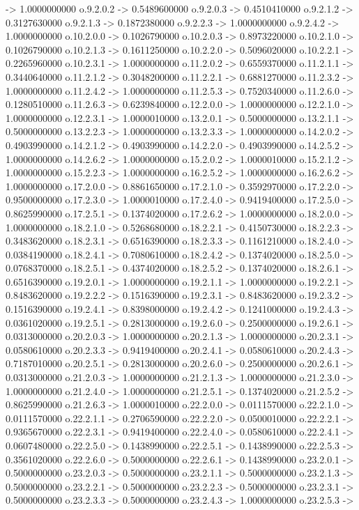 -> 1.0000000000    o.9.2.0.2 -> 0.5489600000    o.9.2.0.3 -> 0.4510410000    o.9.2.1.2 -> 0.3127630000    o.9.2.1.3 -> 0.1872380000    o.9.2.2.3 -> 1.0000000000    o.9.2.4.2 -> 1.0000000000    o.10.2.0.0 -> 0.1026790000    o.10.2.0.3 -> 0.8973220000    o.10.2.1.0 -> 0.1026790000    o.10.2.1.3 -> 0.1611250000    o.10.2.2.0 -> 0.5096020000    o.10.2.2.1 -> 0.2265960000    o.10.2.3.1 -> 1.0000000000    o.11.2.0.2 -> 0.6559370000    o.11.2.1.1 -> 0.3440640000    o.11.2.1.2 -> 0.3048200000    o.11.2.2.1 -> 0.6881270000    o.11.2.3.2 -> 1.0000000000    o.11.2.4.2 -> 1.0000000000    o.11.2.5.3 -> 0.7520340000    o.11.2.6.0 -> 0.1280510000    o.11.2.6.3 -> 0.6239840000    o.12.2.0.0 -> 1.0000000000    o.12.2.1.0 -> 1.0000000000    o.12.2.3.1 -> 1.0000010000    o.13.2.0.1 -> 0.5000000000    o.13.2.1.1 -> 0.5000000000    o.13.2.2.3 -> 1.0000000000    o.13.2.3.3 -> 1.0000000000    o.14.2.0.2 -> 0.4903990000    o.14.2.1.2 -> 0.4903990000    o.14.2.2.0 -> 0.4903990000    o.14.2.5.2 -> 1.0000000000    o.14.2.6.2 -> 1.0000000000    o.15.2.0.2 -> 1.0000010000    o.15.2.1.2 -> 1.0000000000    o.15.2.2.3 -> 1.0000000000    o.16.2.5.2 -> 1.0000000000    o.16.2.6.2 -> 1.0000000000    o.17.2.0.0 -> 0.8861650000    o.17.2.1.0 -> 0.3592970000    o.17.2.2.0 -> 0.9500000000    o.17.2.3.0 -> 1.0000010000    o.17.2.4.0 -> 0.9419400000    o.17.2.5.0 -> 0.8625990000    o.17.2.5.1 -> 0.1374020000    o.17.2.6.2 -> 1.0000000000    o.18.2.0.0 -> 1.0000000000    o.18.2.1.0 -> 0.5268680000    o.18.2.2.1 -> 0.4150730000    o.18.2.2.3 -> 0.3483620000    o.18.2.3.1 -> 0.6516390000    o.18.2.3.3 -> 0.1161210000    o.18.2.4.0 -> 0.0384190000    o.18.2.4.1 -> 0.7080610000    o.18.2.4.2 -> 0.1374020000    o.18.2.5.0 -> 0.0768370000    o.18.2.5.1 -> 0.4374020000    o.18.2.5.2 -> 0.1374020000    o.18.2.6.1 -> 0.6516390000    o.19.2.0.1 -> 1.0000000000    o.19.2.1.1 -> 1.0000000000    o.19.2.2.1 -> 0.8483620000    o.19.2.2.2 -> 0.1516390000    o.19.2.3.1 -> 0.8483620000    o.19.2.3.2 -> 0.1516390000    o.19.2.4.1 -> 0.8398000000    o.19.2.4.2 -> 0.1241000000    o.19.2.4.3 -> 0.0361020000    o.19.2.5.1 -> 0.2813000000    o.19.2.6.0 -> 0.2500000000    o.19.2.6.1 -> 0.0313000000    o.20.2.0.3 -> 1.0000000000    o.20.2.1.3 -> 1.0000000000    o.20.2.3.1 -> 0.0580610000    o.20.2.3.3 -> 0.9419400000    o.20.2.4.1 -> 0.0580610000    o.20.2.4.3 -> 0.7187010000    o.20.2.5.1 -> 0.2813000000    o.20.2.6.0 -> 0.2500000000    o.20.2.6.1 -> 0.0313000000    o.21.2.0.3 -> 1.0000000000    o.21.2.1.3 -> 1.0000000000    o.21.2.3.0 -> 1.0000000000    o.21.2.4.0 -> 1.0000000000    o.21.2.5.1 -> 0.1374020000    o.21.2.5.2 -> 0.8625990000    o.21.2.6.3 -> 1.0000010000    o.22.2.0.0 -> 0.0111570000    o.22.2.1.0 -> 0.0111570000    o.22.2.1.1 -> 0.2706590000    o.22.2.2.0 -> 0.0500010000    o.22.2.2.1 -> 0.9365670000    o.22.2.3.1 -> 0.9419400000    o.22.2.4.0 -> 0.0580610000    o.22.2.4.1 -> 0.0607480000    o.22.2.5.0 -> 0.1438990000    o.22.2.5.1 -> 0.1438990000    o.22.2.5.3 -> 0.3561020000    o.22.2.6.0 -> 0.5000000000    o.22.2.6.1 -> 0.1438990000    o.23.2.0.1 -> 0.5000000000    o.23.2.0.3 -> 0.5000000000    o.23.2.1.1 -> 0.5000000000    o.23.2.1.3 -> 0.5000000000    o.23.2.2.1 -> 0.5000000000    o.23.2.2.3 -> 0.5000000000    o.23.2.3.1 -> 0.5000000000    o.23.2.3.3 -> 0.5000000000    o.23.2.4.3 -> 1.0000000000    o.23.2.5.3 -> 